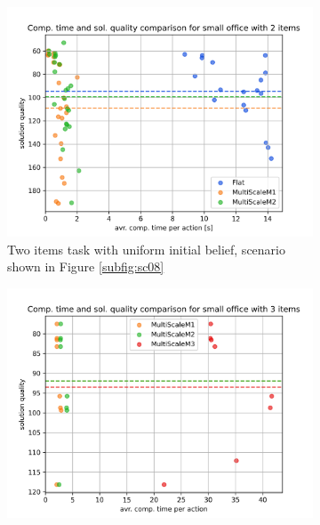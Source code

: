 \begin{figure}
\begin{subfigure}[b]{0.49\textwidth}
        \label{subfig:comp_sc04}
    \end{subfigure}
    \hfill
    \begin{subfigure}[b]{0.49\textwidth}
        \includegraphics[width=\textwidth]{Report/images/comp_time_vs_sol_quality/envsmall_sc08_scatter_comptimes_vs_solqual.png}
        \caption{Two items task with uniform initial belief, scenario shown in Figure \ref{subfig:sc08}}
        \label{subfig:comp_sc08}
    \end{subfigure}
    \hfill
    \begin{subfigure}[b]{0.49\textwidth}
         \includegraphics[width=\textwidth]{Report/images/comp_time_vs_sol_quality/envsmall_sc09_scatter_comptimes_vs_solqual.png}

\end{subfigure}
\end{figure}
